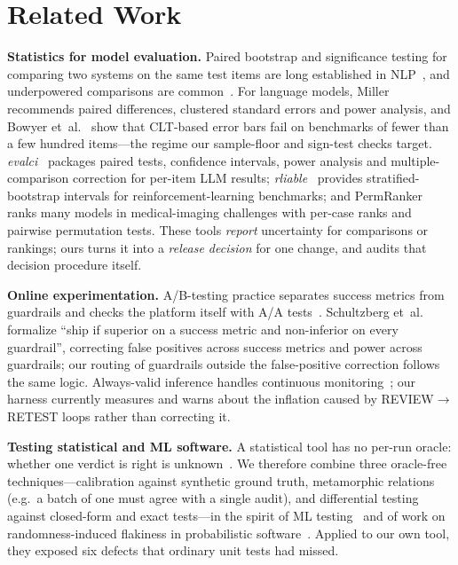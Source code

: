 
\section{Related Work}
\label{sec:related}

\textbf{Statistics for model evaluation.}
Paired bootstrap and significance testing for comparing two systems on the same test items are
long established in NLP~\cite{koehn2004significance,dror2018hitchhiker}, and underpowered
comparisons are common~\cite{card2020power}. For language models, Miller~\cite{miller2024errorbars}
recommends paired differences, clustered standard errors and power analysis, and Bowyer
et~al.~\cite{bowyer2025clt} show that CLT-based error bars fail on benchmarks of fewer than a few
hundred items---the regime our sample-floor and sign-test checks target. \emph{evalci}~\cite{evalci2026}
packages paired tests, confidence intervals, power analysis and multiple-comparison correction for
per-item LLM results; \emph{rliable}~\cite{agarwal2021precipice} provides stratified-bootstrap
intervals for reinforcement-learning benchmarks; and PermRanker~\cite{bakas2026permranker} ranks many
models in medical-imaging challenges with per-case ranks and pairwise permutation tests. These
tools \emph{report} uncertainty for comparisons or rankings; ours turns it into a \emph{release
decision} for one change, and audits that decision procedure itself.

\textbf{Online experimentation.}
A/B-testing practice separates success metrics from guardrails and checks the platform itself
with A/A tests~\cite{kohavi2020trustworthy}. Schultzberg et~al.~\cite{schultzberg2024riskaware}
formalize ``ship if superior on a success metric and non-inferior on every guardrail'', correcting
false positives across success metrics and power across guardrails; our routing of guardrails
outside the false-positive correction follows the same logic. Always-valid inference handles
continuous monitoring~\cite{johari2022alwaysvalid}; our harness currently measures and warns about
the inflation caused by REVIEW$\to$RETEST loops rather than correcting it.

\textbf{Testing statistical and ML software.}
A statistical tool has no per-run oracle: whether one verdict is right is unknown~\cite{barr2015oracle}.
We therefore combine three oracle-free techniques---calibration against synthetic ground truth,
metamorphic relations~\cite{segura2016metamorphic} (e.g.\ a batch of one must agree with a single
audit), and differential testing~\cite{mckeeman1998differential} against closed-form and exact
tests---in the spirit of ML testing~\cite{zhang2020mltesting} and of work on randomness-induced
flakiness in probabilistic software~\cite{dutta2020flaky}. Applied to our own tool, they exposed six
defects that ordinary unit tests had missed.

